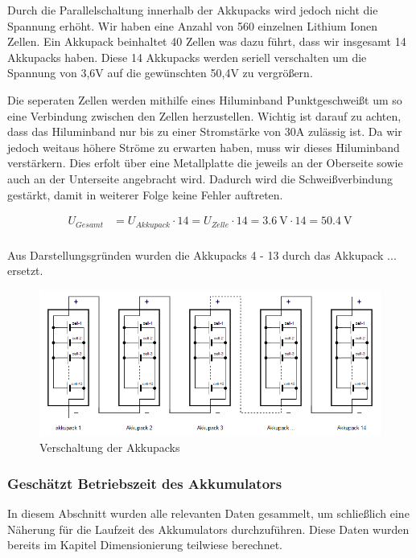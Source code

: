 Durch die Parallelschaltung innerhalb der Akkupacks wird jedoch nicht die Spannung erhöht. Wir haben eine Anzahl von 560 einzelnen Lithium Ionen Zellen. Ein Akkupack beinhaltet 40 Zellen was dazu führt, dass wir insgesamt 14 Akkupacks haben. Diese 14 Akkupacks werden seriell verschalten um die Spannung von 3,6V auf die gewünschten 50,4V zu vergrößern.

Die seperaten Zellen werden mithilfe eines Hiluminband Punktgeschweißt um so eine Verbindung zwischen den Zellen herzustellen.
Wichtig ist darauf zu achten, dass das Hiluminband nur bis zu einer Stromstärke von 30A zulässig ist. Da wir jedoch weitaus höhere Ströme zu erwarten haben, muss wir dieses Hiluminband verstärkern. Dies erfolt über eine Metallplatte die jeweils an der Oberseite sowie auch an der Unterseite angebracht wird. Dadurch wird die Schweißverbindung gestärkt, damit in weiterer Folge keine Fehler auftreten. 

\begin{align*}
U_{Gesamt} &= U_{Akkupack} \cdot 14= U_{Zelle} \cdot 14= 3.6~\mathrm{V} \cdot 14 = 50.4~\mathrm{V}\\
\end{align*}

Aus Darstellungsgründen wurden die Akkupacks 4 - 13 durch das  Akkupack ... ersetzt.

\begin{figure}[H]
	\begin{center}
		\includegraphics[scale=0.9]{figures/Akku/VerschaltungderAkkupacks.PNG}
		\caption{Verschaltung der Akkupacks}
		\label{Verschaltung der Akkupacks}
	\end{center}
\end{figure}
\newpage
\subsubsection{Geschätzt Betriebszeit des Akkumulators}

In diesem Abschnitt wurden alle relevanten Daten gesammelt, um schließlich eine Näherung für die Laufzeit des Akkumulators durchzuführen. Diese Daten wurden bereits im Kapitel Dimensionierung teilwiese berechnet.

